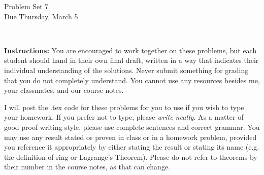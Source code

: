 \documentclass[11pt]{article}
\title{}
\date{\vspace{-0.5in}}
\theoremstyle{definition}
\begin{document}
\thispagestyle{fancy}
\pagestyle{fancy}

\vspace{3em}

\begin{center}
	{\LARGE Problem Set 7 \\}
	Due Thursday, March 5
\end{center}

\

\noindent
{\bf Instructions:}
You are encouraged to work together on these problems, but each student should hand in their own final draft, written in a way that indicates their individual understanding of the solutions. Never submit something for grading that you do not completely understand. You cannot use any resources besides me, your classmates, and our course notes.


I will post the .tex code for these problems for you to use if you wish to type your homework. If you prefer not to type, please  {\em write neatly}. As a matter of good proof writing style, please use complete sentences and correct grammar. You may use any result stated or proven in class or in a homework problem, provided you reference it appropriately by either stating the result or stating its name (e.g. the definition of ring or Lagrange's Theorem). Please do not refer to theorems by their number in the course notes, as that can change.


\
\end{document}
